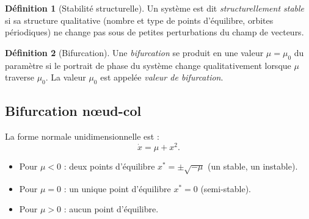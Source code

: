 \documentclass[12pt,a4paper,openany]{book}
\theoremstyle{definition}
\newtheorem{definition}{Définition}[chapter]
\theoremstyle{plain}
\theoremstyle{remark}
\begin{document}
\begin{definition}[Stabilité structurelle]
\label{def:stab-struct}
Un système est dit \emph{structurellement stable} si sa structure
qualitative (nombre et type de points d'équilibre, orbites périodiques)
ne change pas sous de petites perturbations du champ de vecteurs.
\end{definition}

\begin{definition}[Bifurcation]
\label{def:bifurcation}
Une \emph{bifurcation} se produit en une valeur $\mu = \mu_0$ du
paramètre si le portrait de phase du système change qualitativement
lorsque $\mu$ traverse $\mu_0$. La valeur $\mu_0$ est appelée
\emph{valeur de bifurcation}.
\end{definition}

\subsection{Bifurcation n\oe ud-col}
\label{subsec:bif-noeud-col}

La forme normale unidimensionnelle est :
\begin{equation}
\label{eq:bif-noeud-col}
\dot{x} = \mu + x^2.
\end{equation}

\begin{itemize}
  \item Pour $\mu < 0$ : deux points d'équilibre $x^* = \pm\sqrt{-\mu}$
        (un stable, un instable).
  \item Pour $\mu = 0$ : un unique point d'équilibre $x^* = 0$
        (semi-stable).
  \item Pour $\mu > 0$ : aucun point d'équilibre.
\end{itemize}

\begin{center}
\end{center}
\end{document}

